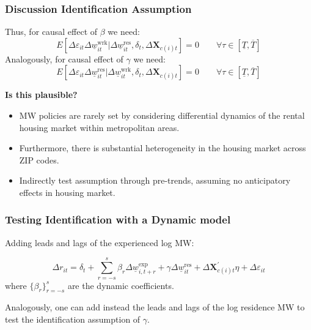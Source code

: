\documentclass[aspectratio=169, t]{beamer}
\newcommand{\MW}{\underline{w}}
\begin{document}
\begin{frame}
	\frametitle{Discussion Identification Assumption}
	
	Thus, for causal effect of $\beta$ we need:
	$$
	E \left[\Delta \varepsilon_{it} \Delta \MW^{\text{wrk}}_{it}  
	\big| \Delta \MW^{\text{res}}_{it}, \delta_t, \Delta 
	\mathbf{X}_{c(i)t} \right] = 0
	\quad \quad \forall \tau \in \left[ \underline{T}, \overline{T} \right]
	$$
	\vspace{.5mm}
	Analogously, for causal effect of $\gamma$ we need:
	$$
	E \left[\Delta \varepsilon_{it} \Delta \MW^{\text{res}}_{it}  
	\big| \Delta \MW^{\text{wrk}}_{it}, \delta_t, \Delta \mathbf{X}_{c(i)t} 
	\right] = 0
	\quad \quad \forall \tau \in \left[ \underline{T}, \overline{T} \right]
	$$
	
	\pause
	\vspace{.5mm}
	\textbf{Is this plausible?}
	\begin{itemize} \small
		\vspace{.5mm}
		\item MW policies are rarely set by considering differential dynamics of the 
		rental housing market within metropolitan areas.
		
		\vspace{.5mm}
		\item Furthermore, there is substantial heterogeneity in the housing market 
		across ZIP codes.
		
		\vspace{.5mm}
		\item Indirectly test assumption through pre-trends, assuming no anticipatory 
		effects in housing market.
	\end{itemize}
\end{frame}


\begin{frame}[label = dyn_model]
	\frametitle{Testing Identification with a Dynamic model}
	
	Adding leads and lags of the experienced log MW:
	
	$$
	\Delta r_{it} = \delta_t
		+ \sum_{r=-s}^{s} \beta_r \Delta \MW^{\text{exp}}_{i,t+r}
		+ \gamma \Delta \MW^{\text{res}}_{it}
		+ \Delta \mathbf{X}^{'}_{c(i)t}\eta
		+ \Delta \varepsilon_{it}
    $$	
	where $\{\beta_r\}_{r=-s}^{s}$ are the dynamic coefficients.
	
	\vspace{3mm}

    Analogously, one can add instead the leads and lags of the log residence MW
    to test the identification assumption of $\gamma$.
\end{frame}
\end{document}
